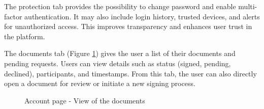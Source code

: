 The protection tab provides the possibility to change password and enable multi-factor authentication. 
It may also include login history, trusted devices, and alerts for unauthorized access. 
This improves transparency and enhances user trust in the platform.

The documents tab (Figure \ref{accountspage-documents}) gives the user a list of their documents and pending requests. 
Users can view details such as status (signed, pending, declined), participants, and timestamps. 
From this tab, the user can also directly open a document for review or initiate a new signing process. 

\begin{figure}[H]
    \centering
    \caption{Account page - View of the documents}
    \label{accountspage-documents}
\end{figure}

